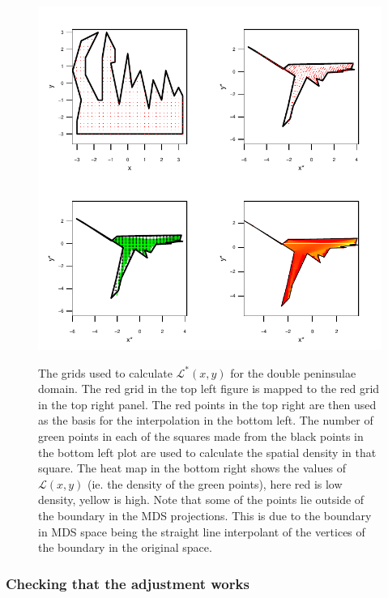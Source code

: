 {\begin{figure}
\centering
\includegraphics{mds/figs/densgrid.pdf} \\
\caption{The grids used to calculate $\mathcal{L}^*(x,y)$ for the double peninsulae domain. The red grid in the top left figure is mapped to the red grid in the top right panel. The red points in the top right are then used as the basis for the interpolation in the bottom left. The number of green points in each of the squares made from the black points in the bottom left plot are used to calculate the spatial density in that square. The heat map in the bottom right shows the values of $\mathcal{L}(x,y)$ (ie. the density of the green points), here red is low density, yellow is high. Note that some of the points lie outside of the boundary in the MDS projections. This is due to the boundary in MDS space being the straight line interpolant of the vertices of the boundary in the original space.}
\label{densgrid}
\end{figure}

\subsubsection{Checking that the adjustment works}

}
